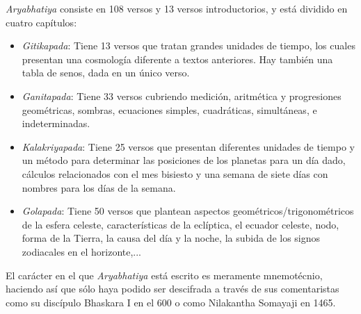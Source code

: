 \documentclass[a4paper, 11pt]{article}
\begin{document}
		\textit{Aryabhatiya} consiste en 108 versos y 13 versos introductorios, y está dividido en cuatro capítulos:
		\begin{itemize}
			\item \textit{Gitikapada}: Tiene 13 versos que tratan grandes unidades de tiempo, los cuales presentan una
			cosmología diferente a textos anteriores. Hay también una tabla de senos, dada en un único verso.
			\item \textit{Ganitapada}: Tiene 33 versos cubriendo medición, aritmética y progresiones geométricas, sombras,
			ecuaciones simples, cuadráticas, simultáneas, e indeterminadas.
			\item \textit{Kalakriyapada}: Tiene 25 versos que presentan diferentes unidades de tiempo y un método para
			determinar las posiciones de los planetas para un día dado, cálculos relacionados con el mes bisiesto y una
			semana de siete días con nombres para los días de la semana.
			\item \textit{Golapada}: Tiene 50 versos que plantean aspectos geométricos/trigonométricos de la esfera
			celeste, características de la eclíptica, el ecuador celeste, nodo, forma de la Tierra, la causa del día
			y la noche, la subida de los signos zodiacales en el horizonte,...
		\end{itemize}
		
		El carácter en el que \textit{Aryabhatiya} está escrito es meramente mnemotécnio, haciendo así que sólo haya
		podido ser descifrada a través de sus comentaristas como su discípulo Bhaskara I en el 600 o como Nilakantha
		Somayaji en 1465.
		
\end{document}
